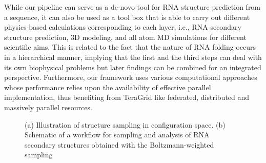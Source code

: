 \documentclass[a4paper,11pt]{article}
\newcommand{\up}{\vspace*{-1em}}
\begin{document}
While our pipeline can serve as a de-novo tool for RNA structure prediction from a sequence, it can also be used as a tool box that is able to carry out different physics-based calculations corresponding to each layer, i.e., RNA secondary structure prediction, 3D modeling, and all atom MD simulations for different scientific aims.  This is related to the fact that the nature of RNA folding occurs in a hierarchical manner, implying that the first and the third steps can deal with its own biophysical problems but later findings can be combined for an integrated perspective. Furthermore, our framework uses various computational approaches whose performance relies upon the availability of effective parallel implementation, thus benefiting from TeraGrid like federated, distributed and massively parallel resources.

\begin{figure}
\begin{center}
\end{center}
\up\up
\caption{(a) Illustration of structure sampling in configuration space.  (b) Schematic of a workflow for sampling and analysis of RNA secondary structures obtained with the Boltzmann-weighted sampling}
\label{fig:folding energy landscape}
\end{figure}
\end{document}
